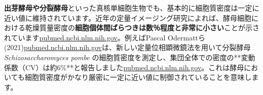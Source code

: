 \textbf{出芽酵母や分裂酵母}といった真核単細胞生物でも、基本的に細胞質密度は一定に近い値に維持されています。近年の定量イメージング研究によれば、酵母細胞における乾燥質量密度の\textbf{細胞個体間ばらつきは数％程度と非常に小さい}ことが示されています\href{https://pubmed.ncbi.nlm.nih.gov/34100714/\#:~:text=variation\%20,dependent\%20density}{pubmed.ncbi.nlm.nih.gov}。例えばPascal Odermattら (2021)\href{https://pubmed.ncbi.nlm.nih.gov/34100714/\#:~:text=Intracellular\%20density\%20impacts\%20the\%20physical,Spatially\%20heterogeneous\%20patterns\%20of\%20density}{pubmed.ncbi.nlm.nih.gov}は、新しい定量位相顕微鏡法を用いて分裂酵母 \textit{Schizosaccharomyces pombe} の細胞質密度を測定し、集団全体での密度の**変動係数（CV）は約6\%**と報告しました\href{https://pubmed.ncbi.nlm.nih.gov/34100714/\#:~:text=variation\%20,dependent\%20density}{pubmed.ncbi.nlm.nih.gov}。これは酵母においても細胞質密度がかなり厳密に一定に近い値に制御されていることを意味します。

